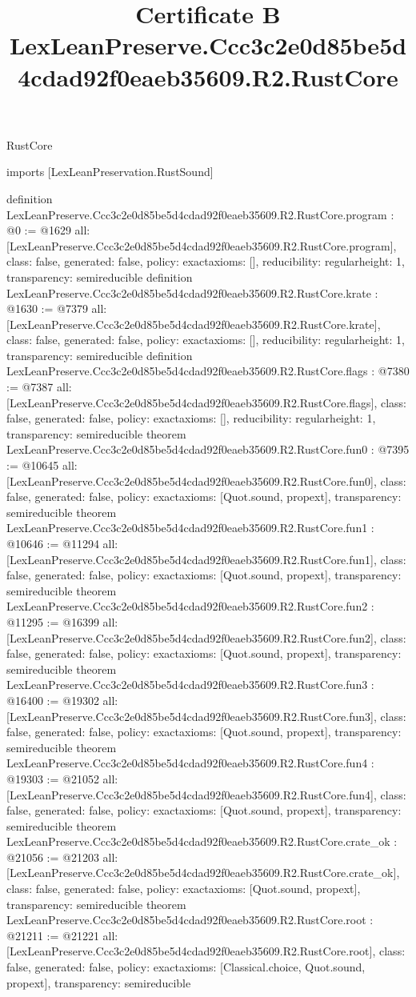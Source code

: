 \begin{lexlean}{RustCore}
\title{Certificate B LexLeanPreserve.Ccc3c2e0d85be5d4cdad92f0eaeb35609.R2.RustCore}
\begin{coremodule}
imports [LexLeanPreservation.RustSound]

definition LexLeanPreserve.Ccc3c2e0d85be5d4cdad92f0eaeb35609.R2.RustCore.program : @0 := @1629 {
  all: [LexLeanPreserve.Ccc3c2e0d85be5d4cdad92f0eaeb35609.R2.RustCore.program],
  class: false,
  generated: false,
  policy: exact{axioms: []},
  reducibility: regular{height: 1},
  transparency: semireducible
}
definition LexLeanPreserve.Ccc3c2e0d85be5d4cdad92f0eaeb35609.R2.RustCore.krate : @1630 := @7379 {
  all: [LexLeanPreserve.Ccc3c2e0d85be5d4cdad92f0eaeb35609.R2.RustCore.krate],
  class: false,
  generated: false,
  policy: exact{axioms: []},
  reducibility: regular{height: 1},
  transparency: semireducible
}
definition LexLeanPreserve.Ccc3c2e0d85be5d4cdad92f0eaeb35609.R2.RustCore.flags : @7380 := @7387 {
  all: [LexLeanPreserve.Ccc3c2e0d85be5d4cdad92f0eaeb35609.R2.RustCore.flags],
  class: false,
  generated: false,
  policy: exact{axioms: []},
  reducibility: regular{height: 1},
  transparency: semireducible
}
theorem LexLeanPreserve.Ccc3c2e0d85be5d4cdad92f0eaeb35609.R2.RustCore.fun0 : @7395 := @10645 {
  all: [LexLeanPreserve.Ccc3c2e0d85be5d4cdad92f0eaeb35609.R2.RustCore.fun0],
  class: false,
  generated: false,
  policy: exact{axioms: [Quot.sound, propext]},
  transparency: semireducible
}
theorem LexLeanPreserve.Ccc3c2e0d85be5d4cdad92f0eaeb35609.R2.RustCore.fun1 : @10646 := @11294 {
  all: [LexLeanPreserve.Ccc3c2e0d85be5d4cdad92f0eaeb35609.R2.RustCore.fun1],
  class: false,
  generated: false,
  policy: exact{axioms: [Quot.sound, propext]},
  transparency: semireducible
}
theorem LexLeanPreserve.Ccc3c2e0d85be5d4cdad92f0eaeb35609.R2.RustCore.fun2 : @11295 := @16399 {
  all: [LexLeanPreserve.Ccc3c2e0d85be5d4cdad92f0eaeb35609.R2.RustCore.fun2],
  class: false,
  generated: false,
  policy: exact{axioms: [Quot.sound, propext]},
  transparency: semireducible
}
theorem LexLeanPreserve.Ccc3c2e0d85be5d4cdad92f0eaeb35609.R2.RustCore.fun3 : @16400 := @19302 {
  all: [LexLeanPreserve.Ccc3c2e0d85be5d4cdad92f0eaeb35609.R2.RustCore.fun3],
  class: false,
  generated: false,
  policy: exact{axioms: [Quot.sound, propext]},
  transparency: semireducible
}
theorem LexLeanPreserve.Ccc3c2e0d85be5d4cdad92f0eaeb35609.R2.RustCore.fun4 : @19303 := @21052 {
  all: [LexLeanPreserve.Ccc3c2e0d85be5d4cdad92f0eaeb35609.R2.RustCore.fun4],
  class: false,
  generated: false,
  policy: exact{axioms: [Quot.sound, propext]},
  transparency: semireducible
}
theorem LexLeanPreserve.Ccc3c2e0d85be5d4cdad92f0eaeb35609.R2.RustCore.crate_ok : @21056 := @21203 {
  all: [LexLeanPreserve.Ccc3c2e0d85be5d4cdad92f0eaeb35609.R2.RustCore.crate_ok],
  class: false,
  generated: false,
  policy: exact{axioms: [Quot.sound, propext]},
  transparency: semireducible
}
theorem LexLeanPreserve.Ccc3c2e0d85be5d4cdad92f0eaeb35609.R2.RustCore.root : @21211 := @21221 {
  all: [LexLeanPreserve.Ccc3c2e0d85be5d4cdad92f0eaeb35609.R2.RustCore.root],
  class: false,
  generated: false,
  policy: exact{axioms: [Classical.choice, Quot.sound, propext]},
  transparency: semireducible
}


\end{coremodule}
\end{lexlean}
